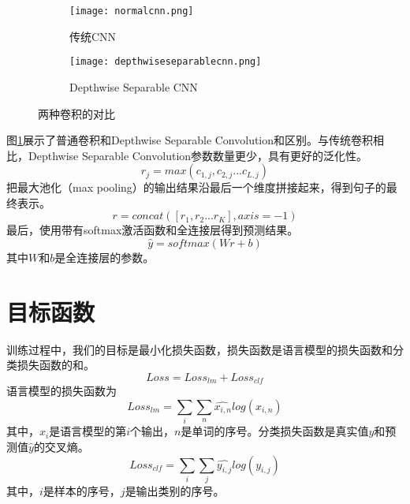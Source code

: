 \begin{figure}[h]
	\centering%
	\begin{subfigure}{0.45\textwidth}
		\centering
		\texttt{[image: normalcnn.png]}
		\caption{传统CNN}
	\end{subfigure}%
	\begin{subfigure}{0.55\textwidth}
		\centering
		\texttt{[image: depthwiseseparablecnn.png]}
		\caption{Depthwise Separable CNN}
	\end{subfigure}
	\caption{两种卷积的对比}
	\label{fig:cnncompare}
\end{figure}
图\ref{fig:cnncompare}展示了普通卷积和Depthwise Separable Convolution和区别。与传统卷积相比，Depthwise Separable Convolution参数数量更少，具有更好的泛化性。
\begin{equation}
    r_j=max(c_{1,j},c_{2,j}...c_{L,j})
\end{equation}
把最大池化（max pooling）的输出结果沿最后一个维度拼接起来，得到句子的最终表示。
\begin{equation}
    r=concat([r_1,r_2...r_K],axis=-1)
\end{equation}
最后，使用带有softmax激活函数和全连接层得到预测结果。
\begin{equation}
    \hat{y}=softmax(Wr+b)
\end{equation}
其中$W$和$b$是全连接层的参数。
\section{目标函数}
训练过程中，我们的目标是最小化损失函数，损失函数是语言模型的损失函数和分类损失函数的和。
\begin{equation}
    Loss=Loss_{lm}+Loss_{clf}
\end{equation}   
语言模型的损失函数为
\begin{equation}
    Loss_{lm}=\sum_{i}\sum_{n}\hat{x_{i,n}}log(x_{i,n})
\end{equation}
其中，$x_i$是语言模型的第$i$个输出，$n$是单词的序号。分类损失函数是真实值$y$和预测值$\hat{y}$的交叉熵。
\begin{equation}
    Loss_{clf}=\sum_{i}\sum
    _{j}\hat{y_{i,j}}log(y_{i,j})
\end{equation}
其中，$i$是样本的序号，$j$是输出类别的序号。
